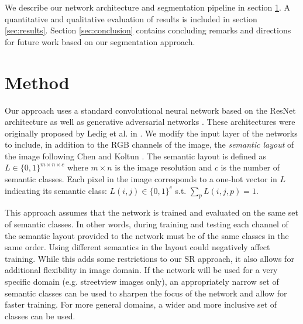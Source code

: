 \documentclass[10pt,twocolumn,letterpaper]{article}
\begin{document}
We describe our network architecture and segmentation pipeline in section
\ref{sec:method}. A quantitative and qualitative evaluation of results is
included in section \ref{sec:results}. Section \ref{sec:conclusion} contains
concluding remarks and directions for future work based on our segmentation
approach.


\section{Method}
\label{sec:method}

Our approach uses a standard convolutional neural network based on the ResNet
architecture \cite{ResNet} as well as generative adversarial networks
\cite{GAN}. These architectures were originally proposed by Ledig et al. in
\cite{SRGAN}. We modify the input layer of the networks to include, in addition
to the RGB channels of the image, the \textit{semantic layout} of the image
following Chen and Koltun \cite{ImageSynthesis}. The semantic layout is defined
as $L \in \{0, 1\}^{m \times n \times c}$ where $m \times n$ is the image
resolution and $c$ is the number of semantic classes. Each pixel in the image
corresponds to a one-hot vector in $L$ indicating its semantic class: $L(i, j)
\in \{0, 1\}^c$ s.t. $\sum_p L(i, j, p) = 1$.

This approach assumes that the network is trained and evaluated on the same set
of semantic classes. In other words, during training and testing each channel
of the semantic layout provided to the network must be of the same classes in
the same order. Using different semantics in the layout could negatively affect
training. While this adds some restrictions to our SR approach, it also allows
for additional flexibility in image domain. If the network will be used for a
very specific domain (e.g. streetview images only), an appropriately narrow set
of semantic classes can be used to sharpen the focus of the network and allow
for faster training. For more general domains, a wider and more inclusive set
of classes can be used.
\end{document}
